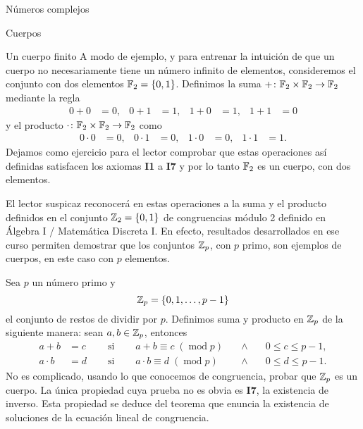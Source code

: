 \begin{chapter}{N\'umeros complejos}
\begin{section}{Cuerpos}
        \begin{subsection}{Un cuerpo finito}
            A modo de ejemplo, y para entrenar la intuición de que un cuerpo no necesariamente tiene un número infinito de elementos, consideremos el conjunto con dos elementos $\mathbb F_2=\{0,1\}$. Definimos la suma $+\colon\mathbb F_2\times \mathbb F_2\to \mathbb F_2$ mediante la regla
            \begin{align*}
            0+0&=0, & 0+1&=1, & 1+0&=1, & 1+1&=0
            \end{align*}
            y el producto $\cdot \colon\mathbb F_2\times \mathbb F_2\to \mathbb F_2$ como 
            \begin{align*}
            0\cdot 0&=0, & 0\cdot 1&=0, & 1\cdot 0&=0, & 1\cdot 1&=1.
            \end{align*}
            Dejamos como ejercicio para el lector comprobar que estas operaciones así definidas satisfacen los axiomas \textbf{I1} a \textbf{I7} y por lo tanto $\mathbb F_2$ es un cuerpo, con dos elementos.
            
            \begin{observacion*}
                El lector suspicaz reconocerá en estas operaciones a la suma y el producto definidos en el conjunto $\mathbb Z_2=\{0,1\}$ de congruencias módulo 2  definido en Álgebra I / Matemática Discreta I. En efecto, resultados desarrollados en ese curso permiten demostrar que los conjuntos $\mathbb Z_p$, con $p$ primo, son ejemplos de cuerpos, en este caso con $p$ elementos.
            \end{observacion*}

            \begin{ejemplo*}
                Sea $p$ un número primo y
                $$
                \mathbb Z_p = \{0,1,\ldots, p-1\}
                $$
                el conjunto de restos de dividir por $p$. Definimos suma y producto en $\mathbb Z_p$ de la siguiente manera: sean $a,b \in \mathbb Z_p$,  entonces  
                \begin{equation*}
                    \begin{array}{llllll}
                        a+b &= c\quad &\text{ si }\quad &a+b \equiv c \; (\operatorname{mod}p) \quad&\wedge\quad&0 \le c \le p-1,\\
                        a \cdot b &= d\quad &\text{ si }\quad &a\cdot b \equiv d \; (\operatorname{mod}p) &\wedge& 0 \le d \le p-1.
                    \end{array} 
                \end{equation*}
                No es complicado, usando lo que conocemos de congruencia, probar que $\mathbb Z_p$  es un cuerpo. La única propiedad cuya prueba no es obvia es  \textbf{I7}, la existencia de inverso. Esta propiedad se deduce del teorema que enuncia la existencia de soluciones  de la ecuación lineal de congruencia. 
            \end{ejemplo*}
            

\end{subsection}
\end{section}
\end{chapter}
